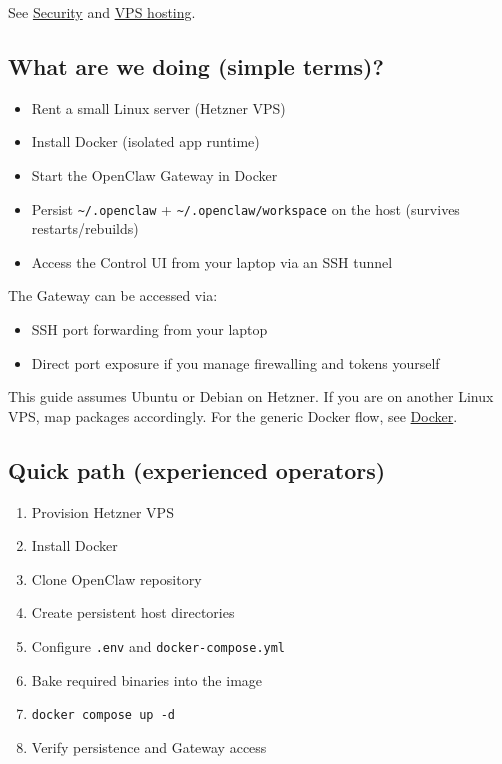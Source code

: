 See \href{/gateway/security}{Security} and \href{/vps}{VPS hosting}.

\subsection{What are we doing (simple terms)?}


\begin{itemize}
  \item Rent a small Linux server (Hetzner VPS)
  \item Install Docker (isolated app runtime)
  \item Start the OpenClaw Gateway in Docker
  \item Persist \texttt{\textasciitilde{}/.openclaw} + \texttt{\textasciitilde{}/.openclaw/workspace} on the host (survives restarts/rebuilds)
  \item Access the Control UI from your laptop via an SSH tunnel
\end{itemize}


The Gateway can be accessed via:

\begin{itemize}
  \item SSH port forwarding from your laptop
  \item Direct port exposure if you manage firewalling and tokens yourself
\end{itemize}


This guide assumes Ubuntu or Debian on Hetzner.
If you are on another Linux VPS, map packages accordingly.
For the generic Docker flow, see \href{/install/docker}{Docker}.

\hrulefill


\subsection{Quick path (experienced operators)}


\begin{enumerate}
  \item Provision Hetzner VPS
  \item Install Docker
  \item Clone OpenClaw repository
  \item Create persistent host directories
  \item Configure \texttt{.env} and \texttt{docker-compose.yml}
  \item Bake required binaries into the image
  \item \texttt{docker compose up -d}
  \item Verify persistence and Gateway access
\end{enumerate}


